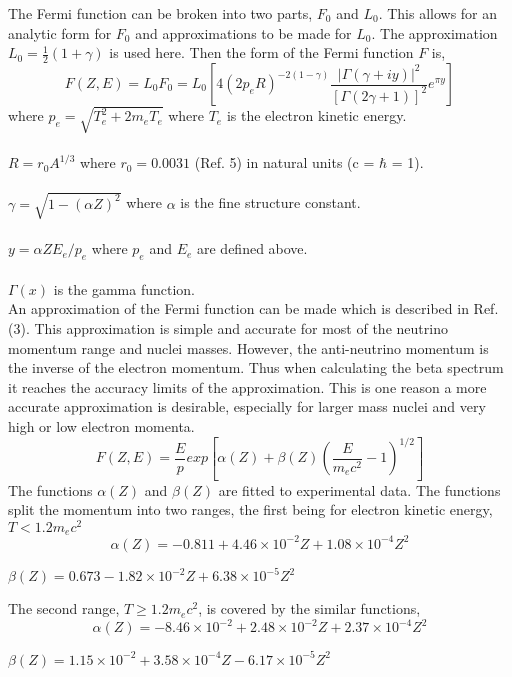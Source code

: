 \documentclass{report}
\begin{document}
 The Fermi function can be broken into two parts, $F_0$ and $L_0$. This allows for an analytic form
 for $F_0$ and approximations to be made for $L_0$. The approximation $L_0 = \frac{1}{2}(1+\gamma)$ is used here. Then the form of the Fermi function $F$ is,
\begin{equation}
F(Z,E) = L_0F_0 = L_0 \left[4(2p_eR)^{-2(1-\gamma)}\frac{|\Gamma(\gamma+iy)|^2}{[\Gamma(2\gamma+1)]^2}e^{\pi y}\right]
\end{equation}
where $p_e = \sqrt{T_e^2 + 2m_eT_e}$  where $T_e$ is the electron kinetic energy.\\ \\
$R = r_0 A^{1/3}$ where $r_0 = 0.0031$ (Ref. 5) in natural units (c = $\hbar$ = 1). \\ \\ 
$\gamma = \sqrt{1 - (\alpha Z)^2}$  where $\alpha$ is the fine structure constant.\\  \\
$y = \alpha Z E_e / p_e$ where $p_e$ and $E_e$ are defined above.\\ \\ 
$\Gamma(x)$ is the gamma function.\\

An approximation of the Fermi function can be made which is described in Ref.(3). This approximation is simple
 and accurate for most of the neutrino momentum range and nuclei masses. However, the 
anti-neutrino momentum is the inverse of the electron momentum. Thus when calculating the beta spectrum it reaches 
the accuracy limits of the approximation. This is one reason a more accurate approximation 
is desirable, especially for larger mass nuclei and very high or low electron momenta.
\begin{equation}
F(Z, E) = \frac{E}{p}exp\left[ \alpha(Z) + \beta(Z) \left( \frac{E}{m_e c^2} -1 \right)^{1/2} \right]
\end{equation} 
The functions $\alpha(Z)$ and $\beta(Z)$ are fitted to experimental data. The functions split the momentum into 
two ranges, the first being for electron kinetic energy, 
$T < 1.2m_e c^2$
\begin{equation}
\alpha(Z) = -0.811 + 4.46  \times 10^{-2} Z + 1.08 \times 10^{-4} Z^2 
\end{equation}
\begin{center}
$\beta(Z) = 0.673 - 1.82 \times 10 ^{-2} Z + 6.38 \times 10^{-5} Z^2$
 \end{center}
 The second range, $T \geq 1.2m_e c^2$, is covered by the similar functions,
\begin{equation}
\alpha(Z) = -8.46 \times 10^{-2} + 2.48  \times 10^{-2} Z + 2.37 \times 10^{-4} Z^2 
\end{equation}
\begin{center}
$\beta(Z) = 1.15 \times 10^{-2} + 3.58 \times 10 ^{-4} Z - 6.17 \times 10^{-5} Z^2$
 \end{center}
\end{document}
